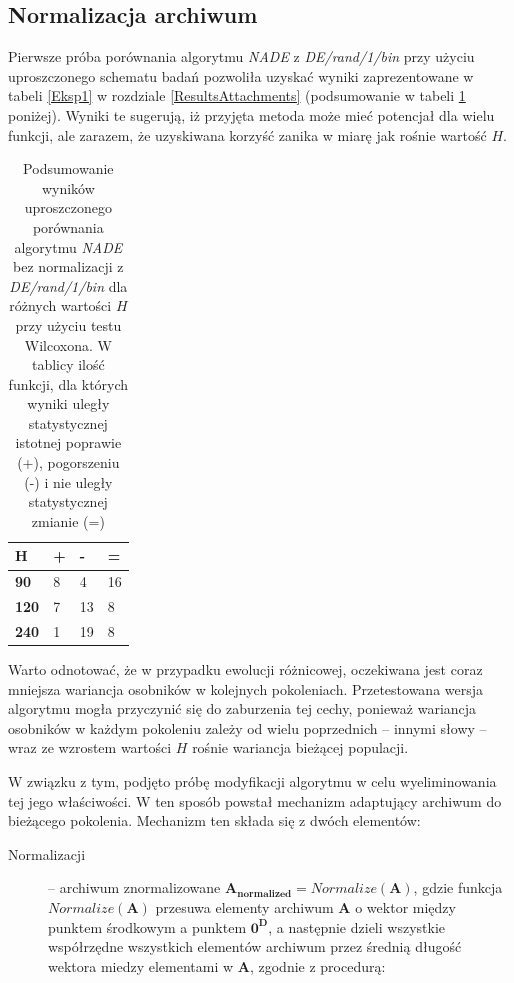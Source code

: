 \documentclass[12pt,a4paper]{report}
\begin{document}
{{{{{{\subsection{Normalizacja archiwum}
\par{
Pierwsze próba porównania algorytmu \emph{NADE} z \emph{DE/rand/1/bin} przy użyciu uproszczonego schematu badań pozwoliła uzyskać wyniki zaprezentowane w tabeli \ref{Eksp1} w rozdziale \ref{ResultsAttachments} (podsumowanie w tabeli \ref{Eksp1short} poniżej). Wyniki te sugerują, iż przyjęta metoda może mieć potencjał dla wielu funkcji, ale zarazem, że uzyskiwana korzyść zanika w miarę jak rośnie wartość $H$.
}
\begin{table}[h]
\centering
\caption{Podsumowanie wyników uproszczonego porównania algorytmu \emph{NADE} bez normalizacji z \emph{DE/rand/1/bin} dla różnych wartości $H$ przy użyciu testu Wilcoxona. W tablicy ilość funkcji, dla których wyniki uległy statystycznej istotnej poprawie (+), pogorszeniu (-) i nie uległy statystycznej zmianie (=)}
\label{Eksp1short}
\begin{tabular}{|l|l|l|l|}
\hline
{\bf H}   & + & -  & =  \\ \hline
{\bf 90}  & 8 & 4  & 16 \\ \hline
{\bf 120} & 7 & 13 & 8  \\ \hline
{\bf 240} & 1 & 19 & 8  \\ \hline
\end{tabular}
\end{table}
\par{
Warto odnotować, że w przypadku ewolucji różnicowej, oczekiwana jest coraz mniejsza wariancja osobników w kolejnych pokoleniach. Przetestowana wersja algorytmu mogła przyczynić się do zaburzenia tej cechy, ponieważ wariancja osobników w każdym pokoleniu zależy od wielu poprzednich -- innymi słowy -- wraz ze wzrostem wartości $H$ rośnie wariancja bieżącej populacji.
}
\par{
W związku z tym, podjęto próbę modyfikacji algorytmu w celu wyeliminowania tej jego właściwości. W ten sposób powstał mechanizm adaptujący archiwum do bieżącego pokolenia. Mechanizm ten składa się z dwóch elementów:
\begin{description}
\item[Normalizacji] -- archiwum znormalizowane $\mathbf{A_{normalized}} = Normalize(\mathbf{A})$, gdzie funkcja $Normalize(\mathbf{A})$ przesuwa elementy archiwum $\mathbf{A}$ o wektor między punktem środkowym a punktem $\mathbf{0^D}$, a następnie dzieli wszystkie współrzędne wszystkich elementów archiwum przez średnią długość wektora miedzy elementami w $\mathbf{A}$, zgodnie z procedurą:


\end{description}}}}}}}}
\end{document}
